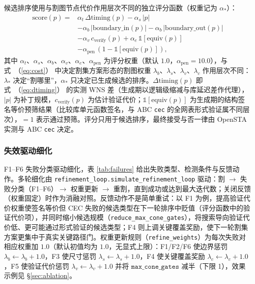 \documentclass[journal]{IEEEtran}
\renewcommand{\eqref}[1]{\textup{（\ref{#1}）}}
\begin{document}
候选排序使用与割图节点代价作用层次不同的独立评分函数（权重记为 $\alpha_*$）：
{\small
\begin{equation}\label{eq:score}
\begin{split}
\mathrm{score}(p) = {}&\alpha_t\,\Delta\mathrm{timing}(p) - \alpha_s\,|p| \\
&- \alpha_b\,|\mathrm{boundary\_in}(p)| - \alpha_b\,|\mathrm{boundary\_out}(p)| \\
&- \alpha_v\,c_{\mathrm{verify}}(p) + \alpha_e\,\mathbb{1}[\mathrm{equiv}(p)] \\
&- \alpha_{\mathrm{pen}}\,(1-\mathbb{1}[\mathrm{equiv}(p)]),
\end{split}
\end{equation}
}
其中 $\alpha_t$、$\alpha_s$、$\alpha_b$、$\alpha_v$、$\alpha_e$、$\alpha_{\mathrm{pen}}$ 为评分权重（默认 $1.0$，$\alpha_{\mathrm{pen}}=10.0$），与式~\eqref{eq:cost} 中决定割集方案形态的割图权重 $\lambda_b$、$\lambda_s$、$\lambda_v$、$\lambda_c$ 作用层次不同：$\lambda_*$ 决定“割哪里”，$\alpha_*$ 只决定已生成候选的排序。$\Delta\mathrm{timing}(p)$ 即式~\eqref{eq:dtiming} 的实测 WNS 差（生成期以逻辑级缩减与库延迟差作代理），$|p|$ 为补丁规模，$c_{\mathrm{verify}}(p)$ 为估计验证代价；$\mathbb{1}[\mathrm{equiv}(p)]$ 为生成期的结构签名等价预筛结果（比较库单元函数签名，与 ABC \texttt{cec} 的全网表形式验证属不同层次），$=1$ 表示通过预筛。评分只用于候选排序，最终接受与否一律由 OpenSTA 实测与 ABC \texttt{cec} 决定。

\subsubsection{失效驱动细化}
F1--F6 失败分类驱动细化，表 \ref{tab:failures} 给出失败类型、检测条件与反馈动作。多轮细化由 \texttt{refinement\_loop.simulate\_refinement\_loop} 驱动：割 $\rightarrow$ 失败分类（F1--F6）$\rightarrow$ 权重更新 $\rightarrow$ 重割，直到成功或达到最大迭代数；关闭反馈（权重固定）时作为消融对照。反馈动作不是简单重试：以 F1 为例，提高验证代价权重使签名等价但 CEC 失败的候选类型在下一轮排序中贬值（评分函数中的验证代价项），并同时缩小候选规模（\texttt{reduce\_max\_cone\_gates}），将搜索导向验证代价低、更可能通过形式验证的候选类型；F4 则上调关键覆盖奖励，使下一轮割集方案更集中于真实关键路径门。权重更新规则（\texttt{refine\_weights}）为每次失败对相应权重加 $1.0$（默认初值均为 $1.0$，无显式上限）：F1/F2/F6 使边界惩罚 $\lambda_b\leftarrow\lambda_b+1.0$，F3 使尺寸惩罚 $\lambda_s\leftarrow\lambda_s+1.0$，F4 使关键覆盖奖励 $\lambda_c\leftarrow\lambda_c+1.0$，F5 使验证代价惩罚 $\lambda_v\leftarrow\lambda_v+1.0$ 并将 $\texttt{max\_cone\_gates}$ 减半（下限 1），效果示例见 \S\ref{sec:ablation}。
\end{document}
